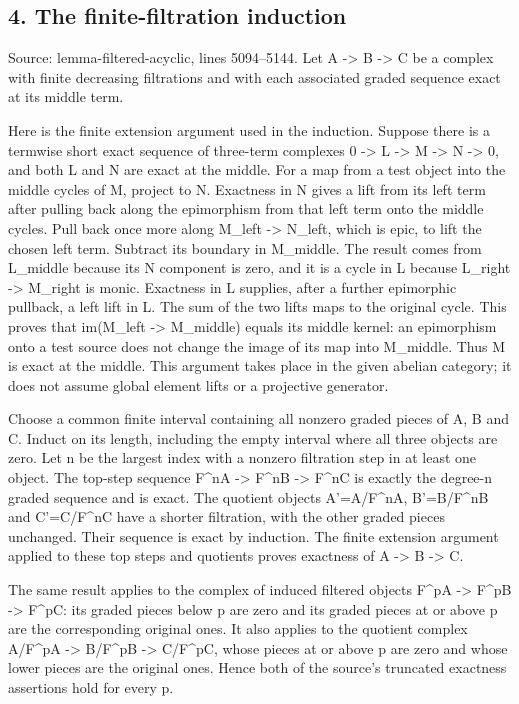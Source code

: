 \documentclass[11pt]{article}
\begin{document}
\subsection{4. The finite-filtration induction}\label{note-05-the-finite-filtration-induction}

Source: lemma-filtered-acyclic, lines 5094--5144. Let A -\textgreater{} B -\textgreater{} C be a complex with finite decreasing filtrations and with each associated graded sequence exact at its middle term.

Here is the finite extension argument used in the induction. Suppose there is a termwise short exact sequence of three-term complexes 0 -\textgreater{} L -\textgreater{} M -\textgreater{} N -\textgreater{} 0, and both L and N are exact at the middle. For a map from a test object into the middle cycles of M, project to N. Exactness in N gives a lift from its left term after pulling back along the epimorphism from that left term onto the middle cycles. Pull back once more along M\_left -\textgreater{} N\_left, which is epic, to lift the chosen left term. Subtract its boundary in M\_middle. The result comes from L\_middle because its N component is zero, and it is a cycle in L because L\_right -\textgreater{} M\_right is monic. Exactness in L supplies, after a further epimorphic pullback, a left lift in L. The sum of the two lifts maps to the original cycle. This proves that im(M\_left -\textgreater{} M\_middle) equals its middle kernel: an epimorphism onto a test source does not change the image of its map into M\_middle. Thus M is exact at the middle. This argument takes place in the given abelian category; it does not assume global element lifts or a projective generator.

Choose a common finite interval containing all nonzero graded pieces of A, B and C. Induct on its length, including the empty interval where all three objects are zero. Let n be the largest index with a nonzero filtration step in at least one object. The top-step sequence F\^{}nA -\textgreater{} F\^{}nB -\textgreater{} F\^{}nC is exactly the degree-n graded sequence and is exact. The quotient objects A'=A/F\^{}nA, B'=B/F\^{}nB and C'=C/F\^{}nC have a shorter filtration, with the other graded pieces unchanged. Their sequence is exact by induction. The finite extension argument applied to these top steps and quotients proves exactness of A -\textgreater{} B -\textgreater{} C.

The same result applies to the complex of induced filtered objects F\^{}pA -\textgreater{} F\^{}pB -\textgreater{} F\^{}pC: its graded pieces below p are zero and its graded pieces at or above p are the corresponding original ones. It also applies to the quotient complex A/F\^{}pA -\textgreater{} B/F\^{}pB -\textgreater{} C/F\^{}pC, whose pieces at or above p are zero and whose lower pieces are the original ones. Hence both of the source's truncated exactness assertions hold for every p.
\end{document}

